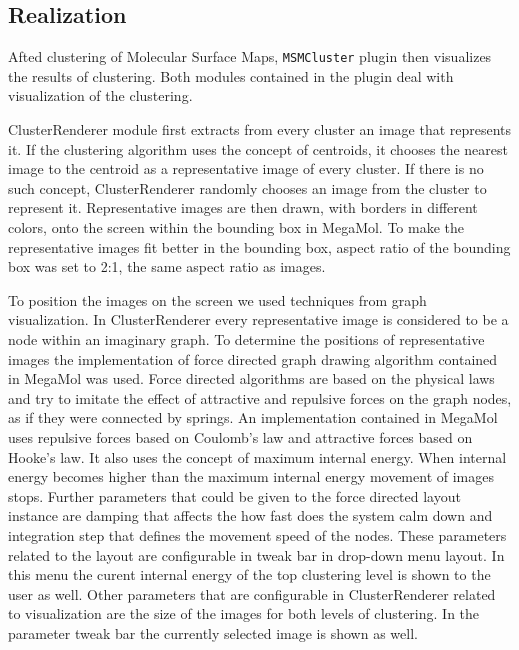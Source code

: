 \documentclass[journal]{vgtc}       %
\begin{document}
\subsection{Realization}

Afted clustering of Molecular Surface Maps, \verb|MSMCluster| plugin then visualizes the results of clustering. Both modules contained in the plugin deal with visualization of the clustering. 

ClusterRenderer module first extracts from every cluster an image that represents it. If the clustering algorithm uses the concept of centroids, it chooses the nearest image to the centroid as a representative image of every cluster. If there is no such concept, ClusterRenderer randomly chooses an image from the cluster to represent it. Representative images are then drawn, with borders in different colors, onto the screen within the bounding box in MegaMol. To make the representative images fit better in the bounding box, aspect ratio of the bounding box was set to 2:1, the same aspect ratio as images.

To position the images on the screen we used techniques from graph visualization. In ClusterRenderer every representative image is considered to be a node within an imaginary graph. To determine the positions of representative images the implementation of force directed graph drawing algorithm contained in MegaMol was used. Force directed algorithms are based on the physical laws and try to imitate the effect of attractive and repulsive forces on the graph nodes, as if they were connected by springs. An implementation contained in MegaMol uses repulsive forces based on Coulomb's law and attractive forces based on Hooke’s law. It also uses the concept of maximum internal energy. When internal energy becomes higher than the maximum internal energy movement of images stops. Further parameters that could be given to the force directed layout instance are damping that affects the how fast does the system calm down and integration step that defines the movement speed of the nodes. 
These parameters related to the layout are configurable in tweak bar in drop-down menu layout. In this menu the curent internal energy of the top clustering level is shown to the user as well.
Other parameters that are configurable in ClusterRenderer related to visualization are the size of the images for both levels of clustering. In the parameter tweak bar the currently selected image is shown as well. 
\end{document}
